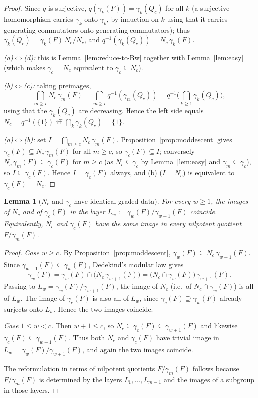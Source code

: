 \documentclass{amsart}
\newtheorem{lemma}{Lemma}
\theoremstyle{definition}
\theoremstyle{remark}
\begin{document}
\begin{proof}
Since $q$ is surjective, $q(\gamma_k(F))=\gamma_k(Q_c)$ for all $k$ (a surjective
homomorphism carries $\gamma_k$ onto $\gamma_k$, by induction on $k$ using that it
carries generating commutators onto generating commutators); thus
$\gamma_k(Q_c)=\gamma_k(F)\,N_c/N_c$, and
$q^{-1}(\gamma_k(Q_c))=N_c\,\gamma_k(F)$.

\emph{(a)$\Leftrightarrow$(d):} this is Lemma~\ref{lem:reduce-to-Bw} together with
Lemma~\ref{lem:easy} (which makes $\gamma_c=N_c$ equivalent to
$\gamma_c\subseteq N_c$).

\emph{(b)$\Leftrightarrow$(c):} taking preimages,
\[
\bigcap_{m\ge c} N_c\,\gamma_m(F)
=\bigcap_{m\ge c} q^{-1}(\gamma_m(Q_c))
=q^{-1}\!\Big(\bigcap_{k\ge1}\gamma_k(Q_c)\Big),
\]
using that the $\gamma_k(Q_c)$ are decreasing. Hence the left side equals
$N_c=q^{-1}(\{1\})$ iff $\bigcap_k\gamma_k(Q_c)=\{1\}$.

\emph{(a)$\Leftrightarrow$(b):} set $I=\bigcap_{m\ge c}N_c\,\gamma_m(F)$.
Proposition~\ref{prop:moddescent} gives $\gamma_c(F)\subseteq N_c\,\gamma_m(F)$ for
all $m\ge c$, so $\gamma_c(F)\subseteq I$; conversely
$N_c\,\gamma_m(F)\subseteq\gamma_c(F)$ for $m\ge c$ (as $N_c\subseteq\gamma_c$ by
Lemma~\ref{lem:easy} and $\gamma_m\subseteq\gamma_c$), so $I\subseteq\gamma_c(F)$.
Hence $I=\gamma_c(F)$ always, and (b) ($I=N_c$) is equivalent to
$\gamma_c(F)=N_c$.
\end{proof}

\begin{lemma}[$N_c$ and $\gamma_c$ have identical graded data]\label{lem:gradedNc}
For every $w\ge1$, the images of $N_c$ and of $\gamma_c(F)$ in the layer
$L_w:=\gamma_w(F)/\gamma_{w+1}(F)$ coincide. Equivalently, $N_c$ and $\gamma_c(F)$
have the same image in every nilpotent quotient $F/\gamma_m(F)$.
\end{lemma}

\begin{proof}
\emph{Case $w\ge c$.} By Proposition~\ref{prop:moddescent},
$\gamma_w(F)\subseteq N_c\,\gamma_{w+1}(F)$. Since $\gamma_{w+1}(F)\subseteq
\gamma_w(F)$, Dedekind's modular law gives
\[
\gamma_w(F)=\gamma_w(F)\cap\big(N_c\,\gamma_{w+1}(F)\big)
=\big(N_c\cap\gamma_w(F)\big)\,\gamma_{w+1}(F).
\]
Passing to $L_w=\gamma_w(F)/\gamma_{w+1}(F)$, the image of $N_c$ (i.e.\ of
$N_c\cap\gamma_w(F)$) is all of $L_w$. The image of $\gamma_c(F)$ is also all of
$L_w$, since $\gamma_c(F)\supseteq\gamma_w(F)$ already surjects onto $L_w$. Hence
the two images coincide.

\emph{Case $1\le w<c$.} Then $w+1\le c$, so $N_c\subseteq\gamma_c(F)\subseteq
\gamma_{w+1}(F)$ and likewise $\gamma_c(F)\subseteq\gamma_{w+1}(F)$. Thus both
$N_c$ and $\gamma_c(F)$ have trivial image in $L_w=\gamma_w(F)/\gamma_{w+1}(F)$,
and again the two images coincide.

The reformulation in terms of nilpotent quotients $F/\gamma_m(F)$ follows because
$F/\gamma_m(F)$ is determined by the layers $L_1,\dots,L_{m-1}$ and the images of
a subgroup in those layers.
\end{proof}
\end{document}
